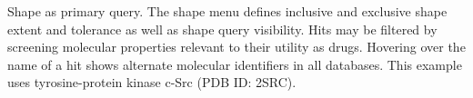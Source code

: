 \label{shapefig} Shape as primary query. The shape menu defines inclusive and exclusive shape extent and tolerance as well as shape query visibility. Hits may be filtered by screening molecular properties relevant to their utility as drugs. Hovering over the name of a hit shows alternate molecular identifiers in all databases. This example uses tyrosine-protein kinase c-Src (PDB ID: 2SRC).